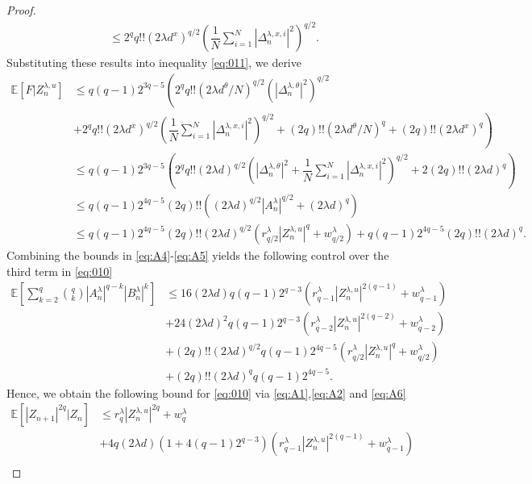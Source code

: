 \documentclass[a4paper, 10pt]{article}
\theoremstyle{plain}%
\begin{document}
\begin{proof}
\begin{align*}
&\leq 2^q q!!(2\lambda d^x)^{q/2}\left(\dfrac{1}{N}\sum_{i=1}^N |\Delta_n^{\lambda,x,i}|^2\right)^{q/2}.
\end{align*}Substituting these results into inequality \eqref{eq:011}, we derive
\begin{align}
\mathbb{E}[F|Z_n^{\lambda,u}]&\leq q(q-1)2^{3q-5}\left(2^qq!!(2\lambda d^{\theta}/N)^{q/2}\left(|\Delta_n^{\lambda,\theta}|^2\right)^{q/2}\right.\nonumber\\
&\left.+2^q q!!(2\lambda d^x)^{q/2}\left(\dfrac{1}{N}\sum_{i=1}^N |\Delta_n^{\lambda,x,i}|^2\right)^{q/2}+(2q)!!(2\lambda d^{\theta}/N)^{q}+(2q)!!(2\lambda d^{x})^{q}\right)\nonumber\\
&\leq q(q-1)2^{3q-5}\left(2^qq!!(2\lambda d)^{q/2}\left(|\Delta_n^{\lambda,\theta}|^2+\dfrac{1}{N}\sum_{i=1}^N |\Delta_n^{\lambda,x,i}|^2\right)^{q/2}+2(2q)!!(2\lambda d)^q\right)\nonumber\\
&\leq q(q-1)2^{4q-5}(2q)!!\left((2\lambda d)^{q/2} \left|A_n^{\lambda}\right|^{q/2}+(2\lambda d)^q\right)\nonumber\\
&\leq q(q-1)2^{4q-5}(2q)!!(2\lambda d)^{q/2}\left(r^{\lambda}_{q/2}|Z_n^{\lambda,u}|^q+w^{\lambda}_{q/2}\right)+q(q-1)2^{4q-5}(2q)!!(2\lambda d)^q.\label{eq:A5}
\end{align}
Combining the bounds in \eqref{eq:A4}-\eqref{eq:A5} yields the following control over the third term in \eqref{eq:010}
\begin{align}
\mathbb{E}\left[\sum_{k=2}^q\binom{q}{k}|A_n^{\lambda}|^{q-k}|B^{\lambda}_n|^k\right]
&\leq 16(2\lambda d)q(q-1)2^{q-3} \left(r_{q-1}^{\lambda}|Z_n^{\lambda,u}|^{2(q-1)}+w_{q-1}^{\lambda}\right)\nonumber\\&+24(2\lambda d)^2q(q-1)2^{q-3} \left(r_{q-2}^{\lambda}|Z_n^{\lambda,u}|^{2(q-2)}+w_{q-2}^{\lambda}\right)\nonumber\\
&+ (2q)!!(2\lambda d)^{q/2}q(q-1)2^{4q-5}\left(r^{\lambda}_{q/2}|Z_n^{\lambda,u}|^q+w^{\lambda}_{q/2}\right)\nonumber\\
&+(2q)!!(2\lambda d)^qq(q-1)2^{4q-5}.\label{eq:A6}
\end{align}
Hence, we obtain the following bound for \eqref{eq:010} via \eqref{eq:A1},\eqref{eq:A2} and \eqref{eq:A6}
\begin{align}
\mathbb{E}\left[|Z_{n+1}|^{2q}|Z_n\right]&\leq r_q^{\lambda}|Z_n^{\lambda,u}|^{2q}+w_q^{\lambda}\nonumber\\
&+4q\left(2\lambda d\right)(1+4(q-1)2^{q-3}) \left(r_{q-1}^{\lambda}|Z_n^{\lambda,u}|^{2(q-1)}+w_{q-1}^{\lambda}\right)\nonumber\\

\end{align}
\end{proof}
\end{document}
